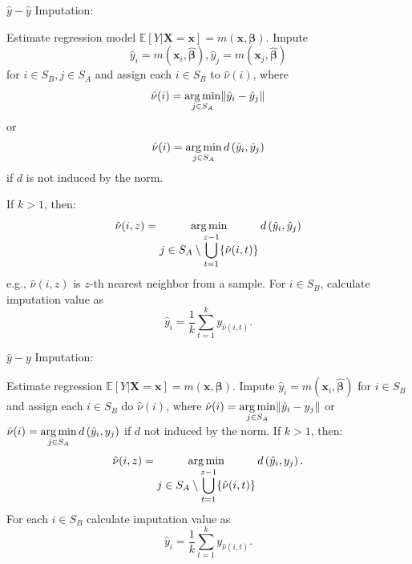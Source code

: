 \documentclass[
]{jss}
\begin{document}
\begin{algorithm}[ht!]
\caption{$\hat{y}-\hat{y}$ Imputation:}
\label{algo-3}
\begin{algorithmic}[1]
\State Estimate regression model $\mathbb{E}[Y|\boldsymbol{X}=\boldsymbol{x}]=m(\boldsymbol{x}, \boldsymbol{\beta})$.\;
\State Impute $$\hat{y}_{i}=m\left(\boldsymbol{x}_{i},\hat{\boldsymbol{\beta}}\right), 
\hat{y}_{j}=m\left(\boldsymbol{x}_{j},\hat{\boldsymbol{\beta}}\right)$$
for $i\in S_{B}, j\in S_{A}$ and assign each 
$i\in S_{B}$ to $\hat{\nu}(i)$, where
$$\displaystyle \hat{\nu}(i)=
\operatornamewithlimits{arg\,min}_{j\in S_{A}}\lVert \hat{y}_{i}-\hat{y}_{j}\rVert$$ or
$$\displaystyle \hat{\nu}(i)=
\operatornamewithlimits{arg\,min}_{j\in S_{A}}d\left(\hat{y}_{i},\hat{y}_{j}\right)$$ if $d$ is not induced by the norm.\;

\State If $k>1$, then:
$$\hat{\nu}(i, z) = \operatornamewithlimits{arg\,min}_{\displaystyle j\in S_{A}\setminus\bigcup_{t=1}^{z-1}
\{\hat{\nu}(i, t)\}} d\left(\hat{y}_{i},\hat{y}_{j}\right)$$
e.g., $\hat{\nu}(i, z)$ is $z$-th nearest neighbor from a sample.\;
\State For $i \in S_B$, calculate imputation value as 
$$
\hat{y}_i = \frac{1}{k}\sum_{t=1}^{k}y_{\hat{\nu}(i, t)}.
$$
\end{algorithmic}
\end{algorithm}

\begin{algorithm}[ht!]
\caption{$\hat{y}-y$ Imputation:}
\label{algo-4}
\begin{algorithmic}[1]
\State Estimate regression $\mathbb{E}[Y|\boldsymbol{X}=\boldsymbol{x}]=m(\boldsymbol{x}, \boldsymbol{\beta})$.\;
\State Impute $\hat{y}_{i}=m\left(\boldsymbol{x}_{i},\hat{\boldsymbol{\beta}}\right)$ 
for $i \in S_{B}$ and assign each 
$i \in S_{B}$ do $\hat{\nu}(i)$, where
$\displaystyle \hat{\nu}(i)=
\operatornamewithlimits{arg\,min}_{j \in S_{A}}\lVert \hat{y}_{i}-y_{j}\rVert$ or
$\displaystyle \hat{\nu}(i)=
\operatornamewithlimits{arg\,min}_{j \in S_{A}}d\left(\hat{y}_{i},y_{j}\right)$ 
if $d$ not induced by the norm.\;
\State If $k>1$, then:
$$\hat{\nu}(i, z) = \operatornamewithlimits{arg\,min}_{\displaystyle j \in S_{A} \setminus \bigcup_{t=1}^{z-1}
\{\hat{\nu}(i, t)\}}
d\left(\hat{y}_{i},y_{j}\right).$$
\State For each $i \in S_B$ calculate imputation value as
$$
\hat{y}_i = \frac{1}{k}\sum_{t=1}^{k}y_{\hat{\nu}(i, t)}.
$$
\end{algorithmic}
\end{algorithm}

\newpage


\end{document}
